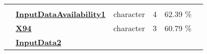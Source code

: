 \documentclass[]{article}
\begin{document}
\begin{longtable}[]{@{}lllrcl@{}}
\begin{minipage}[t]{0.12\columnwidth}
\strut
\end{minipage}\tabularnewline
\begin{minipage}[t]{0.07\columnwidth}\raggedright\strut
\strut
\end{minipage} & \begin{minipage}[t]{0.35\columnwidth}\raggedright\strut
\textbf{\protect\hyperlink{inputdataavailability1}{InputDataAvailability1}}\strut
\end{minipage} & \begin{minipage}[t]{0.11\columnwidth}\raggedright\strut
character\strut
\end{minipage} & \begin{minipage}[t]{0.10\columnwidth}\raggedleft\strut
4\strut
\end{minipage} & \begin{minipage}[t]{0.10\columnwidth}\centering\strut
62.39 \%\strut
\end{minipage} & \begin{minipage}[t]{0.12\columnwidth}\raggedright\strut
\strut
\end{minipage}\tabularnewline
\begin{minipage}[t]{0.07\columnwidth}\raggedright\strut
\strut
\end{minipage} & \begin{minipage}[t]{0.35\columnwidth}\raggedright\strut
\textbf{\protect\hyperlink{x94}{X94}}\strut
\end{minipage} & \begin{minipage}[t]{0.11\columnwidth}\raggedright\strut
character\strut
\end{minipage} & \begin{minipage}[t]{0.10\columnwidth}\raggedleft\strut
3\strut
\end{minipage} & \begin{minipage}[t]{0.10\columnwidth}\centering\strut
60.79 \%\strut
\end{minipage} & \begin{minipage}[t]{0.12\columnwidth}\raggedright\strut
\strut
\end{minipage}\tabularnewline
\begin{minipage}[t]{0.07\columnwidth}\raggedright\strut
\strut
\end{minipage} & \begin{minipage}[t]{0.35\columnwidth}\raggedright\strut
\textbf{\protect\hyperlink{inputdata2}{InputData2}}\strut
\end{minipage} & \begin{minipage}[t]{0.11\columnwidth}\raggedright\strut

\end{minipage}
\end{longtable}
\end{document}
